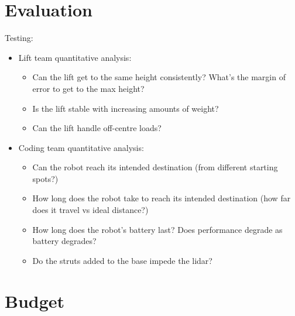 \documentclass{article}
\begin{document}
\section{Evaluation}
Testing:
\begin{itemize}
\item Lift team quantitative analysis:
  \begin{itemize}
  \item Can the lift get to the same height consistently? What's the margin of error to get to the max height?
  \item Is the lift stable with increasing amounts of weight?
  \item Can the lift handle off-centre loads?
  \end{itemize}
\item Coding team quantitative analysis:
  \begin{itemize}
  \item Can the robot reach its intended destination (from different starting spots?)
  \item How long does the robot take to reach its intended destination (how far does it travel vs ideal distance?)
  \item How long does the robot's battery last? Does performance degrade as battery degrades?
  \item Do the struts added to the base impede the lidar? 
  \end{itemize}
\end{itemize}
  
\section{Budget}
\end{document}
